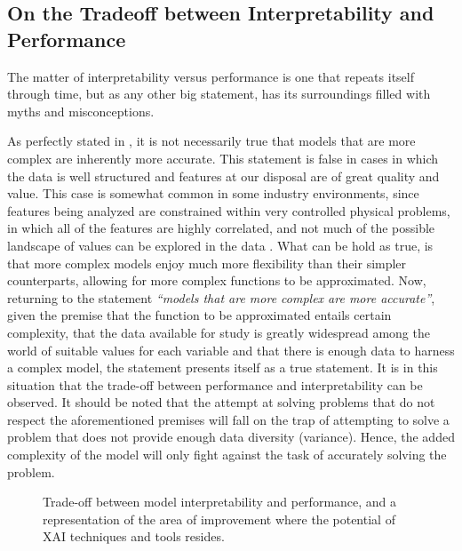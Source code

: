 \documentclass[final]{elsarticle}
\begin{document}
\subsection{On the Tradeoff between Interpretability and Performance} \label{ssec:tradeoff}

The matter of interpretability versus performance is one that repeats itself through time, but as any other big statement, has its surroundings filled with myths and misconceptions.

As perfectly stated in \cite{rudin2018please}, it is not necessarily true that models that are more complex are inherently more accurate. This statement is false in cases in which the data is well structured and features at our disposal are of great quality and value. This case is somewhat common in some industry environments, since features being analyzed are constrained within very controlled physical problems, in which all of the features are highly correlated, and not much of the possible landscape of values can be explored in the data \cite{diez2019data}. What can be hold as true, is that more complex models enjoy much more flexibility than their simpler counterparts, allowing for more complex functions to be approximated. Now, returning to the statement \emph{``models that are more complex are more accurate''}, given the premise that the function to be approximated entails certain complexity, that the data available for study is greatly widespread among the world of suitable values for each variable and that there is enough data to harness a complex model, the statement presents itself as a true statement. It is in this situation that the trade-off between performance and interpretability can be observed. It should be noted that the attempt at solving problems that do not respect the aforementioned premises will fall on the trap of attempting to solve a problem that does not provide enough data diversity (variance). Hence, the added complexity of the model will only fight against the task of accurately solving the problem. 
\begin{figure}[h!]
	\caption{Trade-off between model interpretability and performance, and a representation of the area of improvement where the potential of XAI techniques and tools resides.}
	\label{fig:tradeoff}
\end{figure}
\end{document}
